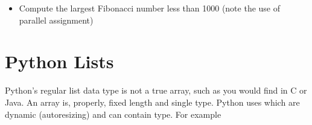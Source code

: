 \documentclass[letterpaper,10pt,english]{jupyterBook}
\begin{document}
\begin{itemize}
\begin{sphinxVerbatim}[commandchars=\\\{\}]
   
	 
\end{sphinxVerbatim}

\item {} 
\sphinxAtStartPar
Compute the largest Fibonacci number less than 1000 (note the use of parallel assignment)

\begin{sphinxVerbatim}[commandchars=\\\{\}]
  
 
		  
\end{sphinxVerbatim}

\end{itemize}


\section{Python Lists}
\label{\detokenize{lessons/jupyter-python-intro:python-lists}}
\sphinxAtStartPar
Python’s regular list data type is not a true array, such as you would find in C or Java. An array is, properly, fixed length and single type. Python uses  which are dynamic (auto\sphinxhyphen{}resizing) and can contain  type. For example

\begin{sphinxVerbatim}[commandchars=\\\{\}]
  \PYG{p}{[}\PYG{p}{]}
  \PYG{p}{[}\PYG{p}{]}
  \PYG{p}{[}\PYG{p}{]}
\PYG{p}{[}\PYG{p}{]}
\PYG{p}{[}\PYG{p}{]}\PYG{p}{[}\PYG{p}{]}
\end{sphinxVerbatim}
\end{document}
